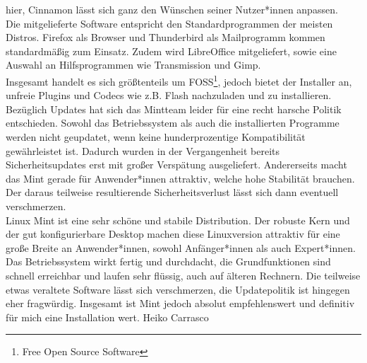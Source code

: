 {{        hier, Cinnamon lässt sich ganz den Wünschen seiner Nutzer*innen anpassen.\\
        Die mitgelieferte Software entspricht den Standardprogrammen der meisten Distros. Firefox als Browser und Thunderbird als Mailprogramm
        kommen standardmäßig zum Einsatz. Zudem wird LibreOffice mitgeliefert,
        sowie eine Auswahl an Hilfsprogrammen wie Transmission und Gimp.\\
        Insgesamt handelt es sich größtenteils um FOSS\footnote{Free Open Source Software}, jedoch bietet der Installer an,
        unfreie Plugins und Codecs wie z.B. Flash nachzuladen und zu
        installieren.\columnbreak\\
        Bezüglich Updates hat sich das Mintteam leider für eine recht harsche Politik entschieden. Sowohl das Betriebssystem als auch die
        installierten Programme werden nicht geupdatet, wenn keine hunderprozentige Kompatibilität gewährleistet ist. Dadurch wurden in der
        Vergangenheit bereits Sicherheitsupdates erst mit großer Verspätung ausgeliefert. Andererseits macht das Mint gerade für Anwender*innen
        attraktiv, welche hohe Stabilität brauchen. Der daraus teilweise
        resultierende Sicherheitsverlust lässt sich dann eventuell verschmerzen.
        \medskip\\
        Linux Mint ist eine sehr schöne und stabile Distribution. Der robuste Kern und der gut konfigurierbare Desktop machen diese Linuxversion
        attraktiv für eine große Breite an Anwender*innen, sowohl Anfänger*innen als auch Expert*innen. Das Betriebssystem wirkt fertig und durchdacht,
        die Grundfunktionen sind schnell erreichbar und laufen sehr flüssig, auch auf älteren Rechnern. Die teilweise etwas veraltete Software
        lässt sich verschmerzen, die Updatepolitik ist hingegen eher fragwürdig. Insgesamt ist Mint jedoch absolut empfehlenswert und definitiv für mich
        eine Installation wert.
    }
    {Heiko Carrasco}}

\vfill
{}


\newpage
